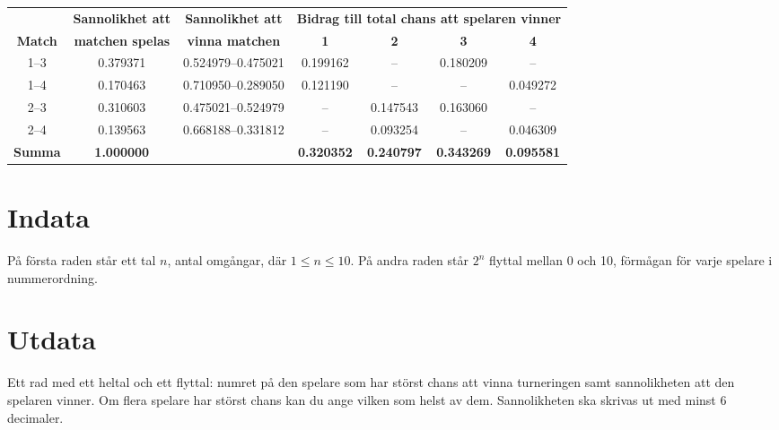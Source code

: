 \begin{tabular}{|c|c|c|c|c|c|c|} \hline
 & {\bf Sannolikhet att} & {\bf Sannolikhet att} & \multicolumn{4}{|c|}{\bf Bidrag till total chans att spelaren vinner}  \\
{\bf Match} & {\bf matchen spelas} & {\bf vinna matchen} & {\bf
  1}&{\bf 2}&{\bf 3}&{\bf 4} \\ \hline
1--3 & 0.379371 & 0.524979--0.475021 & 0.199162 & -- & 0.180209 & -- \\
1--4 & 0.170463 & 0.710950--0.289050 & 0.121190 & -- & -- & 0.049272 \\
2--3 & 0.310603 & 0.475021--0.524979 & -- & 0.147543 & 0.163060 & -- \\
2--4 & 0.139563 & 0.668188--0.331812 & -- & 0.093254 & -- & 0.046309 \\ \hline
{\bf Summa }& {\bf 1.000000} &                & {\bf 0.320352} & {\bf 0.240797} & {\bf 0.343269 }& {\bf 0.095581 } \\ \hline
\end{tabular}

\section*{Indata}
På första raden står ett tal $n$, antal omgångar, där $1\leq n\leq
10$. På andra raden står $2^n$ flyttal mellan 0 och 10, förmågan för
varje spelare i nummerordning.

\section*{Utdata}
Ett rad med ett heltal och ett flyttal: numret på den spelare som har
störst chans att vinna turneringen samt sannolikheten att den spelaren
vinner. Om flera spelare har störst chans kan du ange vilken som helst
av dem. Sannolikheten ska skrivas ut med minst 6 decimaler.

